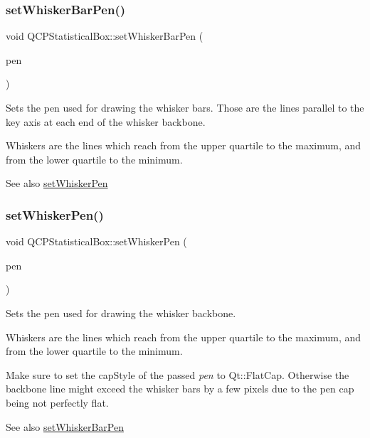 \subsubsection{\texorpdfstring{set\+Whisker\+Bar\+Pen()}{setWhiskerBarPen()}}
{\footnotesize\ttfamily void Q\+C\+P\+Statistical\+Box\+::set\+Whisker\+Bar\+Pen (\begin{DoxyParamCaption}\item[{const Q\+Pen \&}]{pen }\end{DoxyParamCaption})}

Sets the pen used for drawing the whisker bars. Those are the lines parallel to the key axis at each end of the whisker backbone.

Whiskers are the lines which reach from the upper quartile to the maximum, and from the lower quartile to the minimum.

\begin{DoxySeeAlso}{See also}
\hyperlink{class_q_c_p_statistical_box_a4a5034cb3b9b040444df05ab1684620b}{set\+Whisker\+Pen} 
\end{DoxySeeAlso}
\mbox{\label{class_q_c_p_statistical_box_a4a5034cb3b9b040444df05ab1684620b}} 
\subsubsection{\texorpdfstring{set\+Whisker\+Pen()}{setWhiskerPen()}}
{\footnotesize\ttfamily void Q\+C\+P\+Statistical\+Box\+::set\+Whisker\+Pen (\begin{DoxyParamCaption}\item[{const Q\+Pen \&}]{pen }\end{DoxyParamCaption})}

Sets the pen used for drawing the whisker backbone.

Whiskers are the lines which reach from the upper quartile to the maximum, and from the lower quartile to the minimum.

Make sure to set the {\ttfamily cap\+Style} of the passed {\itshape pen} to {\ttfamily Qt\+::\+Flat\+Cap}. Otherwise the backbone line might exceed the whisker bars by a few pixels due to the pen cap being not perfectly flat.

\begin{DoxySeeAlso}{See also}
\hyperlink{class_q_c_p_statistical_box_aa8d3e503897788e1abf68dc74b5f147f}{set\+Whisker\+Bar\+Pen} 
\end{DoxySeeAlso}
\mbox{\label{class_q_c_p_statistical_box_adf378812446bd66f34d1f7f293d991cd}} 
